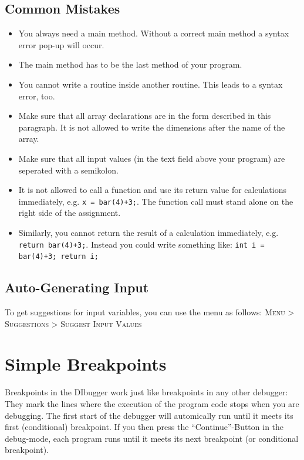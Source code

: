 \documentclass[parskip=full]{memoir}
\begin{document}
\section{Common Mistakes}
\begin{itemize}
\item You always need a main method. Without a correct main method a syntax error pop-up will occur.
\item The main method has to be the last method of your program.
\item You cannot write a routine inside another routine. This leads to a syntax error, too.
\item Make sure that all array declarations are in the form described in this paragraph. It is not allowed to write the dimensions after the name of the array.
\item Make sure that all input values (in the text field above your program) are seperated with a semikolon.
\item It is not allowed to call a function and use its return value for calculations immediately, e.g. \texttt{x = bar(4)+3;}. The function call must stand alone on the right side of the assignment.
\item Similarly, you cannot return the result of a calculation immediately, e.g. \texttt{return bar(4)+3;}. Instead you could write something like: \texttt{int i = bar(4)+3; return i;}
\end{itemize}

\section{Auto-Generating Input}
To get suggestions for input variables, you can use the menu as follows:
\textsc{Menu > Suggestions > Suggest Input Values}

\chapter{Simple Breakpoints}
Breakpoints in the DIbugger work just like breakpoints in any other debugger: They mark the lines where the execution of the program code stops when you are debugging. The first start of the debugger will automically run until it meets its first (conditional) breakpoint. If you then press the \enquote{Continue}-Button in the debug-mode, each program runs until it meets its next breakpoint (or conditional breakpoint).
\end{document}
